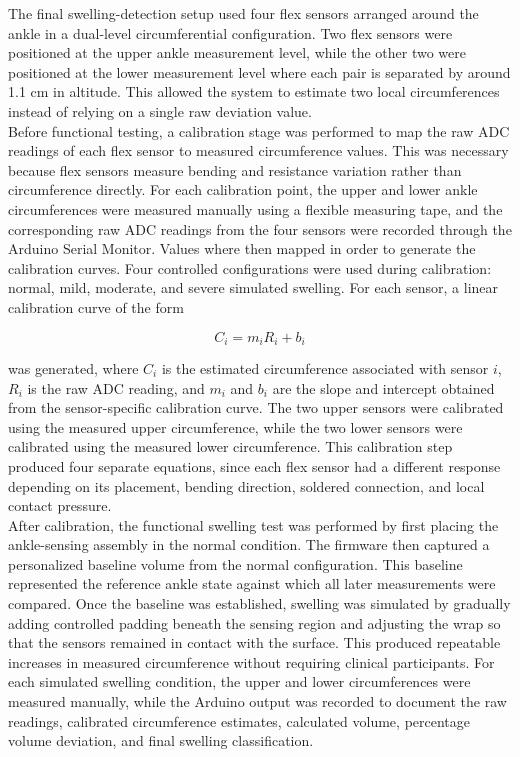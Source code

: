 \noindent The final swelling-detection setup used four flex sensors arranged around the ankle in a dual-level circumferential configuration. Two flex sensors were positioned at the upper ankle measurement level, while the other two were positioned at the lower measurement level where each pair is separated by around 1.1 cm in altitude. This allowed the system to estimate two local circumferences instead of relying on a single raw deviation value. \\

\noindent Before functional testing, a calibration stage was performed to map the raw ADC readings of each flex sensor to measured circumference values. This was necessary because flex sensors measure bending and resistance variation rather than circumference directly. For each calibration point, the upper and lower ankle circumferences were measured manually using a flexible measuring tape, and the corresponding raw ADC readings from the four sensors were recorded through the Arduino Serial Monitor. Values where then mapped in order to generate the calibration curves. Four controlled configurations were used during calibration: normal, mild, moderate, and severe simulated swelling. For each sensor, a linear calibration curve of the form

\begin{equation}
    C_i = m_i R_i + b_i
\end{equation}

\noindent was generated, where $C_i$ is the estimated circumference associated with sensor $i$, $R_i$ is the raw ADC reading, and $m_i$ and $b_i$ are the slope and intercept obtained from the sensor-specific calibration curve. The two upper sensors were calibrated using the measured upper circumference, while the two lower sensors were calibrated using the measured lower circumference. This calibration step produced four separate equations, since each flex sensor had a different response depending on its placement, bending direction, soldered connection, and local contact pressure. \\

\noindent After calibration, the functional swelling test was performed by first placing the ankle-sensing assembly in the normal condition. The firmware then captured a personalized baseline volume from the normal configuration. This baseline represented the reference ankle state against which all later measurements were compared. Once the baseline was established, swelling was simulated by gradually adding controlled padding beneath the sensing region and adjusting the wrap so that the sensors remained in contact with the surface. This produced repeatable increases in measured circumference without requiring clinical participants. For each simulated swelling condition, the upper and lower circumferences were measured manually, while the Arduino output was recorded to document the raw readings, calibrated circumference estimates, calculated volume, percentage volume deviation, and final swelling classification. \\


